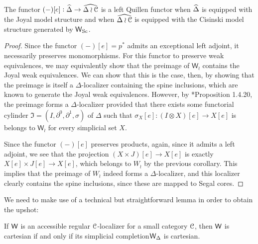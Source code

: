 \begin{cor}\label{ssetadjunction}The functor \((-)[e]:\widehat{\Delta}\to \widehat{\Delta\wr \mathcal{C}}\) is a left Quillen functor when \(\widehat{\Delta}\) is equipped with the Joyal model structure and when \(\widehat{\Delta\wr\mathcal{C}}\) is equipped with the Cisinski model structure generated by \(\mathsf{W}_{{\operatorname{Sc}}}\).  
\end{cor}
\begin{proof} Since the functor \((-)[e]=p^*\) admits an exceptional left adjoint, it necessarily preserves monomorphisms.  For this functor to preserve weak equivalences, we may equivalently show that the preimage of \(\mathsf{W}_\wr\) contains the Joyal weak equivalences. We can show that this is the case, then, by showing that the preimage is itself a \(\Delta\)-localizer containing the spine inclusions, which are known to generate the Joyal weak equivalences.  However, by \cite{cisinski-book}*{Proposition 1.4.20}, the preimage forms a \(\Delta\)-localizer provided that there exists some functorial cylinder \(\mathfrak{I}=(I,\partial^0,\partial^1,\sigma)\) of \(\Delta\) such that \(\sigma_X[e]:(I\otimes X)[e]\to X[e]\) is belongs to \(\mathsf{W}_\wr\) for every simplicial set \(X\).  

Since the functor \((-)[e]\) preserves products, again, since it admits a left adjoint, we see that the projection \((X\times J)[e]\to X[e]\) is exactly \(X[e]\times J[e]\to X[e]\), which belongs to \(W_\wr\) by the previous corollary.  This implies that the preimage of \(W_\wr\) indeed forms a \(\Delta\)-localizer, and this localizer clearly contains the spine inclusions, since these are mapped to Segal cores.
\end{proof}
We need to make use of a technical but straightforward lemma in order to obtain the upshot:
\begin{lemma}\label{scompcart} If \(\mathsf{W}\) is an accessible regular \(\mathcal{C}\)-localizer for a small category \(\mathcal{C}\), then \(\mathsf{W}\) is cartesian if and only if its simplicial completion\(\mathsf{W}_\Delta\) is cartesian.  
\end{lemma}
